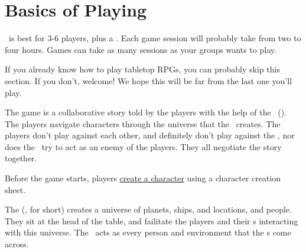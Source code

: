 \section{Basics of Playing}

\par
\getTitle\, is best for 3-6 players, plus a \gm . Each game session will probably take from two to four hours. Games can take as many sessions as your groups wants to play.

\par
If you already know how to play tabletop RPGs, you can probably skip this section. If you don't, welcome! We hope this will be far from the last one you'll play.

\par
The game is a collaborative story told by the players with the help of the \gmLong\, (\gm). The players navigate characters through the universe that the \gm\, creates. The players don't play against each other, and definitely don't play against the \gm , nor does the \gm\, try to act as an enemy of the players. They all negotiate the story together.

\par
Before the game starts, players \hyperlink{Character Creation}{create a character} using a character creation sheet.

\par
The \gmLong (\gm , for short) creates a universe of planets, ships, and locations, and people. They sit at the head of the table, and failitate the players and their \pc s interacting with this universe. The \gm\, acts as every person and environment that the \pc s come across.